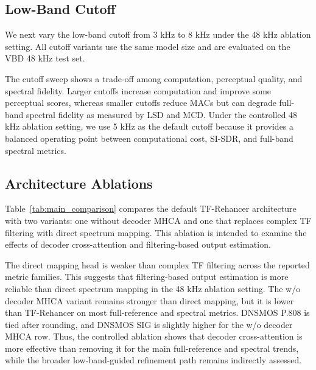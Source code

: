 \subsection{Low-Band Cutoff}
\label{sec:exp_cutoff_sensitivity}

We next vary the low-band cutoff from 3 kHz to 8 kHz under the 48 kHz ablation setting. All cutoff variants use the same model size and are evaluated on the VBD 48 kHz test set.



The cutoff sweep shows a trade-off among computation, perceptual quality, and spectral fidelity. Larger cutoffs increase computation and improve some perceptual scores, whereas smaller cutoffs reduce MACs but can degrade full-band spectral fidelity as measured by LSD and MCD. Under the controlled 48 kHz ablation setting, we use 5 kHz as the default cutoff because it provides a balanced operating point between computational cost, SI-SDR, and full-band spectral metrics.

\subsection{Architecture Ablations}
\label{sec:exp_fullband_ablation}

Table~\ref{tab:main_comparison} compares the default TF-Rehancer architecture with two variants: one without decoder MHCA and one that replaces complex TF filtering with direct spectrum mapping. This ablation is intended to examine the effects of decoder cross-attention and filtering-based output estimation.



The direct mapping head is weaker than complex TF filtering across the reported metric families. This suggests that filtering-based output estimation is more reliable than direct spectrum mapping in the 48 kHz ablation setting. The w/o decoder MHCA variant remains stronger than direct mapping, but it is lower than TF-Rehancer on most full-reference and spectral metrics. DNSMOS P.808 is tied after rounding, and DNSMOS SIG is slightly higher for the w/o decoder MHCA row. Thus, the controlled ablation shows that decoder cross-attention is more effective than removing it for the main full-reference and spectral trends, while the broader low-band-guided refinement path remains indirectly assessed.
